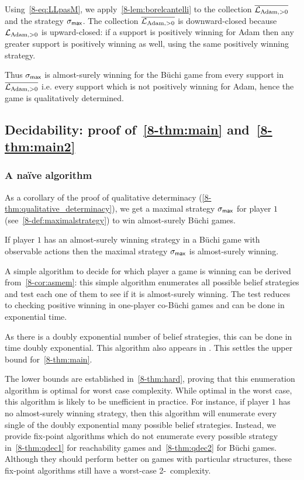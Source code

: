 \medskip


Using~\cref{8-eq:LLpasM}, we apply~\cref{8-lem:borelcantelli} to the collection 
$\overline{\mathcal{L}_{\text{Adam},>0}}$ and the strategy $\sigma_{\textsf{max}}$.
The collection $\overline{\mathcal{L}_{\text{Adam},>0}}$ is downward-closed because $\mathcal{L}_{\text{Adam},>0}$ is upward-closed: if a support is positively winning for Adam then any greater support is positively winning as well, using the same positively winning strategy.

Thus $\sigma_{\textsf{max}}$ is almost-surely winning for the B{\"u}chi game from every support in $\overline{\mathcal{L}_{\text{Adam},>0}}$ i.e. every support which is not positively winning for Adam, hence the game is qualitatively determined.

\subsection{Decidability: proof of~\cref{8-thm:main} and~\cref{8-thm:main2}}
\label{8-subsec:proof}

\subsubsection{A na\"ive algorithm}
As a corollary of the proof of qualitative determinacy
(\cref{8-thm:qualitative_determinacy}), we get a maximal strategy $\sigma_{\textsf{max}}$
for player $1$ (see~\cref{8-def:maximalstrategy}) to win
almost-surely B{\"u}chi games.
\begin{corollary}
\label{8-cor:asmem}
  If player $1$ has an almost-surely winning strategy in a B{\"u}chi
  game {with observable actions} then the maximal strategy $\sigma_{\textsf{max}}$ is almost-surely
  winning.
\end{corollary}

A simple algorithm to decide for which player a game is winning can be derived from~\cref{8-cor:asmem}: this simple algorithm enumerates all possible belief strategies
and test each one of them to see if it is almost-surely winning. The test reduces to checking positive winning in one-player co-B{\"u}chi games and can be done in exponential time.

As there is a doubly exponential number of {belief} strategies, this can be done in time doubly exponential. 
This algorithm also appears in \cite{GS-icalp09}.
This settles the upper bound for~\cref{8-thm:main}. 

The lower bounds are established in~\cref{8-thm:hard}, proving that this enumeration algorithm is
  optimal for worst case complexity.  While optimal in the worst case,
  this algorithm is {likely to be unefficient in practice}.  For instance, if player
  $1$ has no almost-surely winning strategy, then this algorithm will
  enumerate every single of the doubly exponential many {possible belief}
  strategies.  Instead, we provide fix-point algorithms which do not
  enumerate every possible strategy in~\cref{8-thm:qdec1} for
  reachability games and~\cref{8-thm:qdec2} for B{\"u}chi games.
  Although they should perform better on games with particular
  structures, these fix-point algorithms still have a worst-case
  2-\EXPTIME\ complexity.


